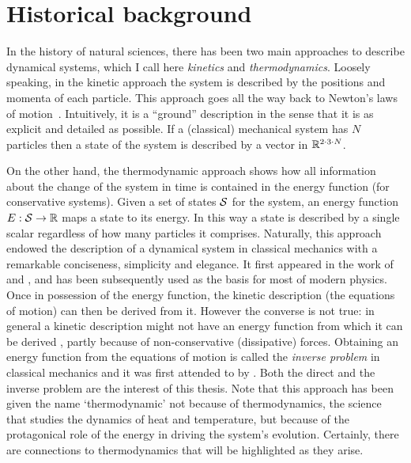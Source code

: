 % 
\section{Historical background}

In the history of natural sciences,
there has been two main approaches to describe dynamical systems,
which I call here
\emph{kinetics} and \emph{thermodynamics}.
Loosely speaking, in the kinetic approach the system is
described by the positions and momenta of each particle.
This approach goes all the way back to
Newton's laws of motion~\citep{newton}.
Intuitively, it is a ``ground'' description in the sense that
it is as explicit and detailed as possible.
If a (classical) mechanical system has $N$ particles
then a state of the system is described by
a vector in $\mathbb{R}^{2 \cdot 3 \cdot N}$.

On the other hand,
the thermodynamic approach shows how
all information about the change of the system in time
is contained in the energy function (for conservative systems).
Given a set of states $\mathcal{S}$ for the system,
an energy function $E: \mathcal{S} \to \mathbb{R}$ maps a state to its energy.
In this way a state is described by a single scalar
regardless of how many particles it comprises.
Naturally, this approach endowed the description of
a dynamical system in classical mechanics
with a remarkable conciseness, simplicity and elegance.
It first appeared in the work of
\citet{lagrange2} and \citet{hamilton},
and has been subsequently used as the basis for most of modern physics.
Once in possession of the energy function,
the kinetic description (\ie the equations of motion)
can then be derived from it.
However the converse is not true:
in general a kinetic description might not have an energy function
from which it can be derived \citep{santilli},
partly because of non-conservative (\eg dissipative) forces.
Obtaining an energy function from the equations of motion
is called the \emph{inverse problem} in classical mechanics
and it was first attended to by \citet{helmholtz}.
Both the direct and the inverse problem are the interest of this thesis.
Note that this approach has been given the name `thermodynamic'
not because of thermodynamics,
the science that studies the dynamics of heat and temperature,
but because of the protagonical role of the energy
in driving the system's evolution.
Certainly, there are connections to thermodynamics
that will be highlighted as they arise.

